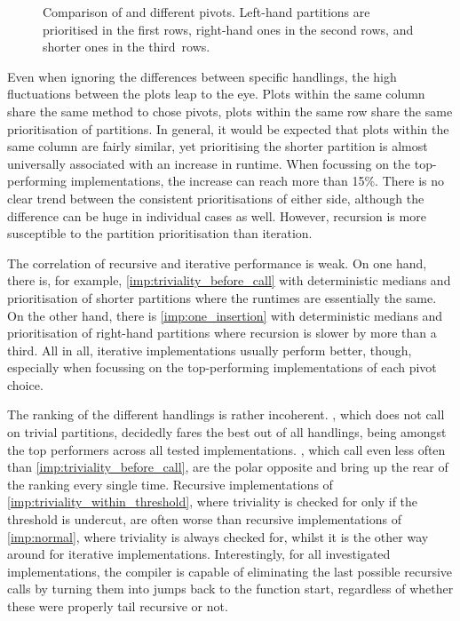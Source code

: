 \begin{figure}[p]
	\tikzexternaldisable
	\hfil{}\hfil
	\tikzexternalenable
	\caption{
		Comparison of  and different pivots.
		Left-hand partitions are prio\-ri\-tised in the first rows, right-hand ones in the second rows, and shorter ones in the third~rows.
	}
	\label{fig:quick:implementations}
\end{figure}

Even when ignoring the differences between specific handlings, the high fluctuations between the plots leap to the eye.
Plots within the same column share the same method to chose pivots, plots within the same row share the same prioritisation of partitions.
In general, it would be expected that plots within the same column are fairly similar, yet prioritising the shorter partition is almost universally associated with an increase in runtime.
When focussing on the top-performing implementations, the increase can reach more than 15\%.
There is no clear trend between the consistent prioritisations of either side, although the difference can be huge in individual cases as well.
However, recursion is more susceptible to the partition prioritisation than iteration.

The correlation of recursive and iterative performance is weak.
On one hand, there is, for example, \cref{imp:triviality_before_call} with deterministic medians and prioritisation of shorter partitions where the runtimes are essentially the same.
On the other hand, there is \cref{imp:one_insertion} with deterministic medians and prioritisation of right-hand partitions where recursion is slower by more than a third.
All in all, iterative implementations usually perform better, though, especially when focussing on the top-performing implementations of each pivot choice.

The ranking of the different handlings is rather incoherent.
, which does not call \QS{} on trivial partitions, decidedly fares the best out of all handlings, being amongst the top performers across all tested implementations.
, which call \QS{} even less often than \cref{imp:triviality_before_call}, are the polar opposite and bring up the rear of the ranking every single time.
Recursive implementations of \cref{imp:triviality_within_threshold}, where triviality is checked for only if the threshold is undercut, are often worse than recursive implementations of \cref{imp:normal}, where triviality is always checked for, whilst it is the other way around for iterative implementations.
Interestingly, for all investigated implementations, the compiler is capable of eliminating the last possible recursive calls by turning them into jumps back to the function start, regardless of whether these were properly tail recursive or not.

